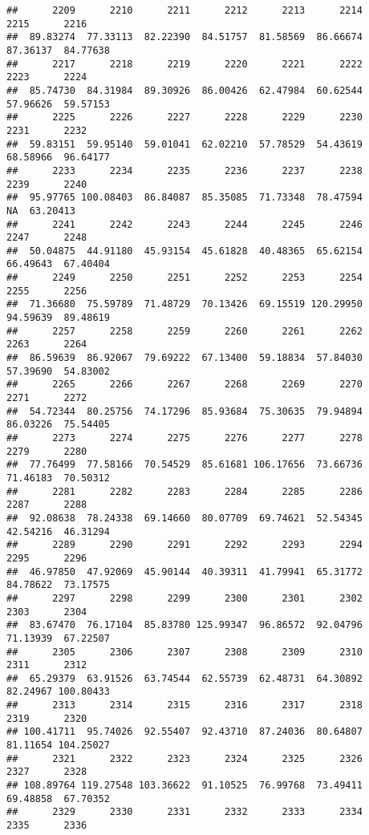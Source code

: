 \documentclass[
]{article}
\begin{document}
\begin{verbatim}
##      2209      2210      2211      2212      2213      2214      2215      2216 
##  89.83274  77.33113  82.22390  84.51757  81.58569  86.66674  87.36137  84.77638 
##      2217      2218      2219      2220      2221      2222      2223      2224 
##  85.74730  84.31984  89.30926  86.00426  62.47984  60.62544  57.96626  59.57153 
##      2225      2226      2227      2228      2229      2230      2231      2232 
##  59.83151  59.95140  59.01041  62.02210  57.78529  54.43619  68.58966  96.64177 
##      2233      2234      2235      2236      2237      2238      2239      2240 
##  95.97765 100.08403  86.84087  85.35085  71.73348  78.47594        NA  63.20413 
##      2241      2242      2243      2244      2245      2246      2247      2248 
##  50.04875  44.91180  45.93154  45.61828  40.48365  65.62154  66.49643  67.40404 
##      2249      2250      2251      2252      2253      2254      2255      2256 
##  71.36680  75.59789  71.48729  70.13426  69.15519 120.29950  94.59639  89.48619 
##      2257      2258      2259      2260      2261      2262      2263      2264 
##  86.59639  86.92067  79.69222  67.13400  59.18834  57.84030  57.39690  54.83002 
##      2265      2266      2267      2268      2269      2270      2271      2272 
##  54.72344  80.25756  74.17296  85.93684  75.30635  79.94894  86.03226  75.54405 
##      2273      2274      2275      2276      2277      2278      2279      2280 
##  77.76499  77.58166  70.54529  85.61681 106.17656  73.66736  71.46183  70.50312 
##      2281      2282      2283      2284      2285      2286      2287      2288 
##  92.08638  78.24338  69.14660  80.07709  69.74621  52.54345  42.54216  46.31294 
##      2289      2290      2291      2292      2293      2294      2295      2296 
##  46.97850  47.92069  45.90144  40.39311  41.79941  65.31772  84.78622  73.17575 
##      2297      2298      2299      2300      2301      2302      2303      2304 
##  83.67470  76.17104  85.83780 125.99347  96.86572  92.04796  71.13939  67.22507 
##      2305      2306      2307      2308      2309      2310      2311      2312 
##  65.29379  63.91526  63.74544  62.55739  62.48731  64.30892  82.24967 100.80433 
##      2313      2314      2315      2316      2317      2318      2319      2320 
## 100.41711  95.74026  92.55407  92.43710  87.24036  80.64807  81.11654 104.25027 
##      2321      2322      2323      2324      2325      2326      2327      2328 
## 108.89764 119.27548 103.36622  91.10525  76.99768  73.49411  69.48858  67.70352 
##      2329      2330      2331      2332      2333      2334      2335      2336 

\end{verbatim}
\end{document}
